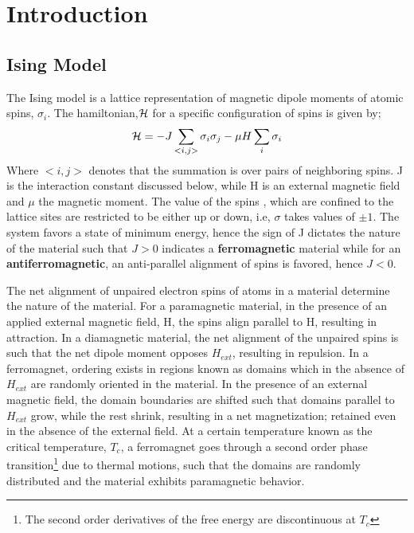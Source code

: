\documentclass[12pt]{article}
\begin{document}


\tableofcontents{}
\section{Introduction}
\subsection{Ising Model}
The Ising model is a lattice representation of magnetic dipole moments of atomic spins, $\sigma_i$.
The hamiltonian,${\cal H}$  for a specific configuration of spins is given by;
\begin{equation}\label{hamiltonian}
{\cal H} = -J\sum_{<i,j>}\sigma_i \sigma_j - \mu H\sum_{i}\sigma_i
\end{equation}
Where $<i,j>$ denotes that the summation  is over pairs of neighboring spins. J is the interaction constant discussed below, while H is an external magnetic field and $\mu$ the magnetic moment.
The value of the spins , which are confined to the lattice sites are restricted to be either up or down, i.e, $\sigma$ takes values of $\pm 1$.
The system favors a state of minimum energy, hence the sign of J dictates the nature of the material such that $J>0$  indicates a \textbf{ ferromagnetic} material while for an \textbf {antiferromagnetic}, an anti-parallel alignment of spins is favored, hence $J <0$. \par The net alignment of unpaired electron spins of atoms in a material determine the nature of the material. For a paramagnetic material, in the presence of an applied external magnetic field, H, the spins align parallel to H, resulting in attraction. In a diamagnetic material, the net alignment of the unpaired spins is such that the net dipole moment opposes $H_{ext}$, resulting in repulsion.
In a ferromagnet, ordering exists in regions known as domains which in the absence of $H_{ext}$ are randomly oriented in the material. In the presence of an external magnetic field, the domain boundaries are shifted such that domains parallel to $H_{ext}$ grow, while the rest shrink, resulting in a net magnetization; retained even in the absence of the external field. At a certain temperature known as the critical temperature, $T_c$, a ferromagnet goes through a second order phase transition\footnote{The second order derivatives of the free energy are discontinuous at $T_c$} due to thermal motions, such that the domains are randomly distributed and the material exhibits paramagnetic behavior.
\end{document}
